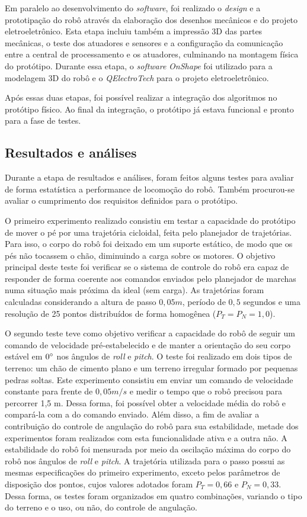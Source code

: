 \documentclass[../main.tex]{subfiles}
\begin{document}
  Em paralelo ao desenvolvimento do \textit{software}, foi realizado o \textit{design} e a prototipação do robô através da elaboração dos desenhos mecânicos e do projeto eletroeletrônico. Esta etapa incluiu também a impressão 3D das partes mecânicas, o teste dos atuadores e sensores e a configuração da comunicação entre a central de processamento e os atuadores, culminando na montagem física do protótipo. Durante essa etapa, o \textit{software} \textit{OnShape} foi utilizado para a modelagem 3D do robô e o \textit{QElectroTech} para o projeto eletroeletrônico.

  Após essas duas etapas, foi possível realizar a integração dos algoritmos no protótipo físico. Ao final da integração, o protótipo já estava funcional e pronto para a fase de testes.

  \subsection{Resultados e análises}
  Durante a etapa de resultados e análises, foram feitos alguns testes para avaliar de forma estatística a performance de locomoção do robô. Também procurou-se avaliar o cumprimento dos requisitos definidos para o protótipo.

  O primeiro experimento realizado consistiu em testar a capacidade do protótipo de mover o pé por uma trajetória cicloidal, feita pelo planejador de trajetórias. Para isso, o corpo do robô foi deixado em um suporte estático, de modo que os pés não tocassem o chão, diminuindo a carga sobre os motores. O objetivo principal deste teste foi verificar se o sistema de controle do robô era capaz de responder de forma coerente aos comandos enviados pelo planejador de marchas numa situação mais próxima da ideal (sem carga). As trajetórias foram calculadas considerando a altura de passo $0,05m$, período de $0,5$ segundos e uma resolução de 25 pontos distribuídos de forma homogênea ($P_T = P_N = 1,0$).
  
  O segundo teste teve como objetivo verificar a capacidade do robô de seguir um comando de velocidade pré-estabelecido e de manter a orientação do seu corpo estável em $0\degree$ nos ângulos de \textit{roll} e \textit{pitch}. O teste foi realizado em dois tipos de terreno: um chão de cimento plano e um terreno irregular formado por pequenas pedras soltas. Este experimento consistiu em enviar um comando de velocidade constante para frente de $0,05 m/s$ e medir o tempo que o robô precisou para percorrer 1,5 m. Dessa forma, foi possível obter a velocidade média do robô e compará-la com a do comando enviado. Além disso, a fim de avaliar a contribuição do controle de angulação do robô para sua estabilidade, metade dos experimentos foram realizados com esta funcionalidade ativa e a outra não. A estabilidade do robô foi mensurada por meio da oscilação máxima do corpo do robô nos ângulos de \textit{roll} e \textit{pitch}. A trajetória utilizada para o passo possui as mesmas especificações do primeiro experimento, exceto pelos parâmetros de disposição dos pontos, cujos valores adotados foram $P_T = 0,66$ e $P_N = 0,33$. Dessa forma, os testes foram organizados em quatro combinações, variando o tipo do terreno e o uso, ou não, do controle de angulação.
  
\end{document}
